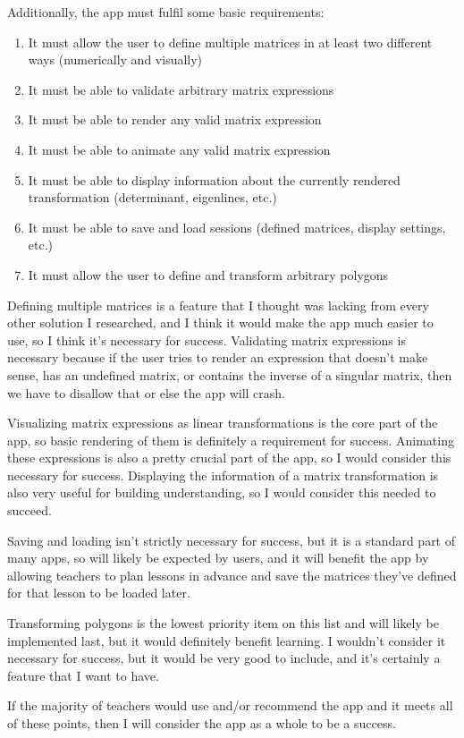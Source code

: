 \documentclass[../main.tex]{subfiles}
\begin{document}
Additionally, the app must fulfil some basic requirements:
\vspace{-0.3cm}
\begin{enumerate}
	\item\label{success-criterion:define-multiple-matrices} It must allow the user to define multiple matrices in at least two different ways (numerically and visually)
	\item\label{success-criterion:validate-arbitrary-matrix-expressions} It must be able to validate arbitrary matrix expressions
	\item\label{success-criterion:render-any-valid-expression} It must be able to render any valid matrix expression
	\item\label{success-criterion:animate-any-valid-expression} It must be able to animate any valid matrix expression
	\item\label{success-criterion:display-matrix-info} It must be able to display information about the currently rendered transformation (determinant, eigenlines, etc.)
	\item\label{success-criterion:save-and-load-sessions} It must be able to save and load sessions (defined matrices, display settings, etc.)
	\item\label{success-criterion:transform-polygons} It must allow the user to define and transform arbitrary polygons
\end{enumerate}

Defining multiple matrices is a feature that I thought was lacking from every other solution I researched, and I think it would make the app much easier to use, so I think it's necessary for success. Validating matrix expressions is necessary because if the user tries to render an expression that doesn't make sense, has an undefined matrix, or contains the inverse of a singular matrix, then we have to disallow that or else the app will crash.

Visualizing matrix expressions as linear transformations is the core part of the app, so basic rendering of them is definitely a requirement for success. Animating these expressions is also a pretty crucial part of the app, so I would consider this necessary for success. Displaying the information of a matrix transformation is also very useful for building understanding, so I would consider this needed to succeed.

Saving and loading isn't strictly necessary for success, but it is a standard part of many apps, so will likely be expected by users, and it will benefit the app by allowing teachers to plan lessons in advance and save the matrices they've defined for that lesson to be loaded later.

Transforming polygons is the lowest priority item on this list and will likely be implemented last, but it would definitely benefit learning. I wouldn't consider it necessary for success, but it would be very good to include, and it's certainly a feature that I want to have.

If the majority of teachers would use and/or recommend the app and it meets all of these points, then I will consider the app as a whole to be a success.
\end{document}

